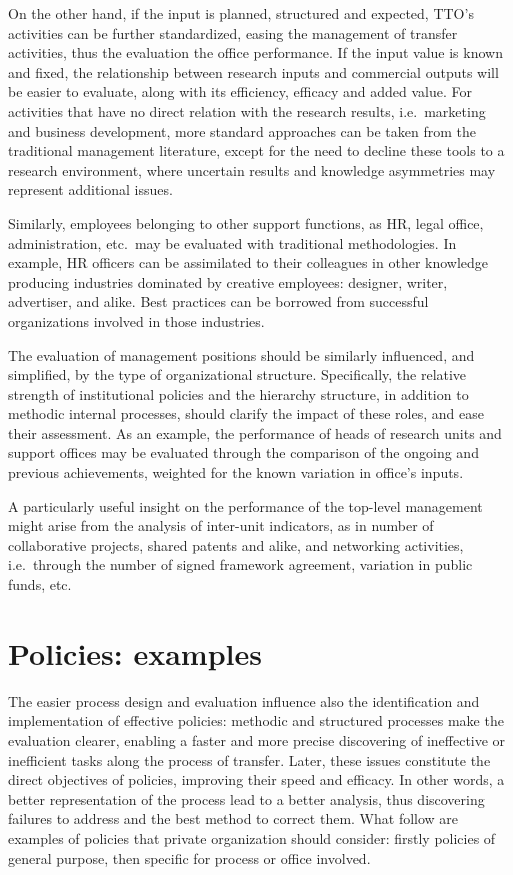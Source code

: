 On the other hand, if the input is planned, structured and expected, TTO's activities can be further standardized, easing the management of transfer activities, thus the evaluation the office performance. If the input value is known and fixed, the relationship between research inputs and commercial outputs will be easier to evaluate, along with its efficiency, efficacy and added value. For activities that have no direct relation with the research results, i.e.\ marketing and business development, more standard approaches can be taken from the traditional management literature, except for the need to decline these tools to a research environment, where uncertain results and knowledge asymmetries may represent additional issues. 

Similarly, employees belonging to other support functions, as HR, legal office, administration, etc.\ may be evaluated with traditional methodologies. In example, HR officers can be assimilated to their colleagues in other knowledge producing industries dominated by creative employees: designer, writer, advertiser, and alike. Best practices can be borrowed from successful organizations involved in those industries.

The evaluation of management positions should be similarly influenced, and simplified, by the type of organizational structure. Specifically, the relative strength of institutional policies and the hierarchy structure, in addition to methodic internal processes, should clarify the impact of these roles, and ease their assessment. As an example, the performance of heads of research units and support offices may be evaluated through the comparison of the ongoing and previous achievements, weighted for the known variation in office's inputs. 

A particularly useful insight on the performance of the top-level management might arise from the analysis of inter-unit indicators, as in number of collaborative projects, shared patents and alike, and networking activities, i.e.\ through the number of signed framework agreement, variation in public funds, etc.

\section{Policies: examples} 

The easier process design and evaluation influence also the identification and implementation of effective policies:  methodic and structured processes make the evaluation clearer, enabling a faster and more precise discovering of ineffective or inefficient tasks along the process of transfer. Later, these issues constitute the direct objectives of policies, improving their speed and efficacy. In other words, a better representation of the process lead to a better analysis, thus discovering failures to address and the best method to correct them. What follow are examples of policies that private organization should consider: firstly policies of general purpose, then specific for process or office involved.

